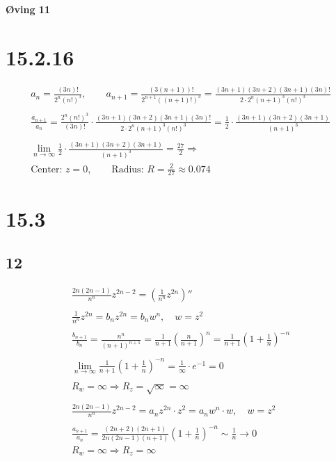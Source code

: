 \begin{center}
	\LARGE{\textbf{Øving 11}}
\end{center}


\section*{15.2.16}


\begin{gather*}
	a_n = \frac{(3 n)!}{2^n (n!)^3},
	\qquad
	a_{n + 1} = \frac{\left(3 (n + 1)\right)!}{2^{n + 1} \left((n + 1)!\right)^3}
	=
	\frac{(3n + 1)(3n + 2)(3n + 1)(3 n)!}{2 \cdot 2^n (n + 1)^3 (n!)^3}
	\\
	\\
	\frac{a_{n + 1}}{a_n} = \frac{2^n (n!)^3}{(3 n)!}
	\cdot
	\frac{(3n + 1)(3n + 2)(3n + 1)(3 n)!}{2 \cdot 2^n (n + 1)^3 (n!)^3}
	=
	\frac{1}{2} \cdot \frac{(3n + 1)(3n + 2)(3n + 1)}{(n + 1)^3}
	\\
	\\
	\lim_{n \rightarrow \infty}{\frac{1}{2} \cdot \frac{(3n + 1)(3n + 2)(3n + 1)}{(n + 1)^3}} = \frac{27}{2} \Rightarrow
	\\
	\text{Center: } z = 0,
	\qquad
	\text{Radius: } R = \frac{2}{27} \approx 0.074
\end{gather*}


\section*{15.3}

\subsection*{12}


\begin{gather*}
	\frac{2 n (2 n - 1)}{n^n} z^{2n - 2} = \left(\frac{1}{n^n} z^{2n}\right)''
	\\
	\\
	\frac{1}{n^n} z^{2n} = b_n z^{2 n} = b_n w^n,
	\quad
	w = z^2
	\\
	\\
	\frac{b_{n + 1}}{b_n} = \frac{n^n}{(n + 1)^{n + 1}}
	=
	\frac{1}{n + 1} \left( \frac{n}{n + 1} \right)^n
	=
	\frac{1}{n + 1} \left( 1 + \frac{1}{n} \right)^{-n}
	\\
	\\
	\lim_{n \rightarrow \infty}{\frac{1}{n + 1} \left( 1 + \frac{1}{n} \right)^{-n}} = \frac{1}{\infty} \cdot e^{-1} = 0
	\\
	\\
	R_w = \infty \Rightarrow R_z = \sqrt{\infty} = \infty
	\\
	\\
	\frac{2 n (2 n - 1)}{n^n} z^{2n - 2} = a_n z^{2 n} \cdot z^2 = a_n w^n \cdot w, \quad w = z^2
	\\
	\\
	\frac{a_{n + 1}}{a_n} = \frac{(2n + 2)(2n + 1)}{2n(2n - 1) (n + 1)} \left( 1 + \frac{1}{n} \right)^{-n} \sim \frac{1}{n} \rightarrow 0
	\\
	R_w = \infty \Rightarrow R_z = \infty
\end{gather*}


